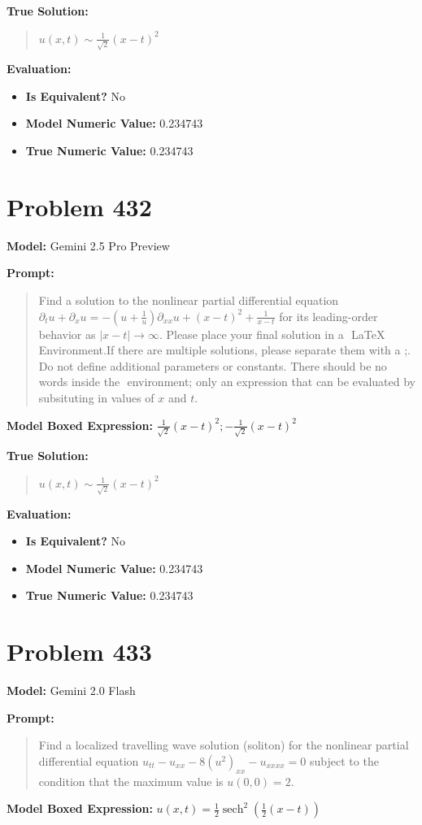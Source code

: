 \documentclass{article}
\begin{document}
\textbf{True Solution:}
\begin{quote}
$u(x,t) \sim \frac{1}{\sqrt{2}} (x-t)^2$
\end{quote}

\textbf{Evaluation:}
\begin{itemize}
\item \textbf{Is Equivalent?} No
\item \textbf{Model Numeric Value:} 0.234743
\item \textbf{True Numeric Value:} 0.234743
\end{itemize}
\vspace{1cm}
\section*{Problem 432}
\textbf{Model:} Gemini 2.5 Pro Preview

\textbf{Prompt:}
\begin{quote}
Find a solution to the nonlinear partial differential equation $ \partial_t u + \partial_x u = -\left(u + \frac{1}{u}\right) \partial_{xx}u + (x-t)^2 + \frac{1}{x-t}$ for its leading-order behavior as $|x-t| \to \infty$. Please place your final solution in a $\boxed{}$ LaTeX Environment.If there are multiple solutions, please separate them with a ;. Do not define additional parameters or constants. There should be no words inside the $\boxed{}$ environment; only an expression that can be evaluated by subsituting in values of $x$ and $t$.
\end{quote}
\textbf{Model Boxed Expression:} $\frac{1}{\sqrt{2}}(x-t)^2; -\frac{1}{\sqrt{2}}(x-t)^2$

\textbf{True Solution:}
\begin{quote}
$u(x,t) \sim \frac{1}{\sqrt{2}} (x-t)^2$
\end{quote}

\textbf{Evaluation:}
\begin{itemize}
\item \textbf{Is Equivalent?} No
\item \textbf{Model Numeric Value:} 0.234743
\item \textbf{True Numeric Value:} 0.234743
\end{itemize}
\vspace{1cm}
\section*{Problem 433}
\textbf{Model:} Gemini 2.0 Flash

\textbf{Prompt:}
\begin{quote}
Find a localized travelling wave solution (soliton) for the nonlinear partial differential equation $u_{tt} - u_{xx} - 8(u^2)_{xx} - u_{xxxx}=0$ subject to the condition that the maximum value is $u(0,0) = 2$.
\end{quote}
\textbf{Model Boxed Expression:} $u(x,t) = \frac{1}{2} \operatorname{sech}^2\left(\frac{1}{2}(x-t)\right)$
\end{document}
